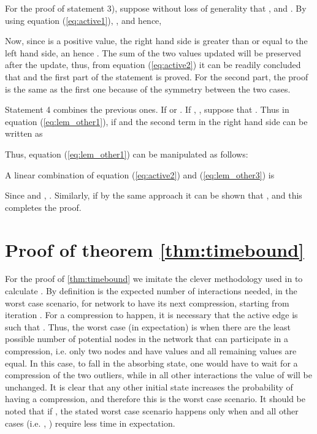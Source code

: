\documentclass[conference]{IEEEtran}
\theoremstyle{definition}
\theoremstyle{definition}
\newcounter{MYtempeqncnt}
\begin{document}
For the proof of statement 3), suppose without loss of generality that ,  and . By using equation (\ref{eq:active1}),
,
and hence,

Now, since  is a positive value, the right hand side is greater than or equal to the left hand side, an hence . The sum of the two values updated will be preserved after the update, thus, from equation (\ref{eq:active2}) it can be  readily concluded that  and the first part of the statement is proved. For the second part, the proof is  the same as the first one because of the symmetry between the two cases.

Statement 4 combines the previous ones. If  or . If , ,  suppose that . Thus in equation (\ref{eq:lem_other1}), if  and  the second term in the right hand side can be written as

Thus, equation (\ref{eq:lem_other1}) can be manipulated as follows:

A linear combination of equation (\ref{eq:active2}) and (\ref{eq:lem_other3}) is

Since  and ,  . Similarly,  if  by the same approach it can be shown that  , and this completes the proof.
\section{Proof of theorem \ref{thm:timebound}}\label{app_2}
\begin{figure*}[!t]
\normalsize
\setcounter{MYtempeqncnt}{\value{equation}}
\setcounter{equation}{40}

\setcounter{equation}{\value{MYtempeqncnt}}
\hrulefill
\vspace*{4pt}
\end{figure*}
For the proof of \ref{thm:timebound} we imitate the clever methodology used in \cite{quant} to calculate . By definition  is the expected number of interactions needed, in the worst case scenario, for network  to have its next compression, starting from iteration . For a compression to happen, it is necessary that the active edge  is such that . Thus, the worst case (in expectation) is when there are the least possible number of potential nodes in the network  that can participate in a compression, i.e. only two nodes  and  have values  and all remaining values are equal. In this case, to fall in  the absorbing state, one would have to wait for a compression of the two outliers, while in all other interactions  the value of  will be unchanged. It is clear that any other initial state increases the probability of having a compression, and therefore this is the worst case scenario. It should be noted that if , the stated worst case scenario happens only when  and all other cases (i.e. , ) require less time in expectation.
\end{document}
